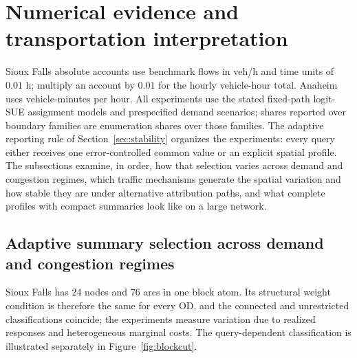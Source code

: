 \section{Numerical evidence and transportation interpretation}\label{sec:numerics}
Sioux Falls absolute accounts use benchmark flows in veh/h and time units of $0.01$ h; multiply an account by $0.01$ for the hourly vehicle-hour total. Anaheim uses vehicle-minutes per hour. All experiments use the stated fixed-path logit-SUE assignment models and prespecified demand scenarios; shares reported over boundary families are enumeration shares over those families. The adaptive reporting rule of Section~\ref{sec:stability} organizes the experiments: every query either receives one error-controlled common value or an explicit spatial profile. The subsections examine, in order, how that selection varies across demand and congestion regimes, which traffic mechanisms generate the spatial variation and how stable they are under alternative attribution paths, and what complete profiles with compact summaries look like on a large network.

\subsection{Adaptive summary selection across demand and congestion regimes}\label{sec:adequate}
Sioux Falls has 24 nodes and 76 arcs in one block atom. Its structural weight condition is therefore the same for every OD, and the connected and unrestricted classifications coincide; the experiments measure variation due to realized responses and heterogeneous marginal costs. The query-dependent classification is illustrated separately in Figure~\ref{fig:blockcut}.

